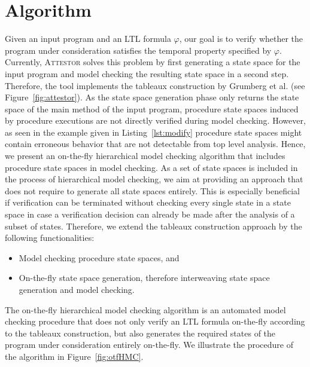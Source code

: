 \documentclass[a4paper, 12pt, twoside]{report}
\begin{document}
	\section{Algorithm}
	
	Given an input program and an LTL formula $\varphi$, our goal is to verify whether the program under consideration satisfies the temporal property specified by $\varphi$. Currently, \textsc{Attestor} solves this problem by first generating a state space for the input program and model checking the resulting state space in a second step. Therefore, the tool implements the tableaux construction by Grumberg et al. (see Figure~\ref{fig:attestor}). As the state space generation phase only returns the state space of the main method of the input program, procedure state spaces induced by procedure executions are not directly verified during model checking. However, as seen in the example given in Listing~\ref{lst:modify} procedure state spaces might contain erroneous behavior that are not detectable from top level analysis. Hence, we present an on-the-fly hierarchical model checking algorithm that includes procedure state spaces in model checking. As a set of state spaces is included in the process of hierarchical model checking, we aim at providing an approach that does not require to generate all state spaces entirely. This is especially beneficial if verification can be terminated without checking every single state in a state space in case a verification decision can already be made after the analysis of a subset of states. Therefore, we extend the tableaux construction approach by the following functionalities:
	\begin{itemize}
		\item Model checking procedure state spaces, and
		\item On-the-fly state space generation, therefore interweaving state space generation and model checking.
	\end{itemize}	

	The on-the-fly hierarchical model checking algorithm is an automated model checking procedure that does not only verify an LTL formula on-the-fly according to the tableaux construction, but also generates the required states of the program under consideration entirely on-the-fly. We illustrate the procedure of the algorithm in Figure~\ref{fig:otfHMC}. \\
	
\end{document}
